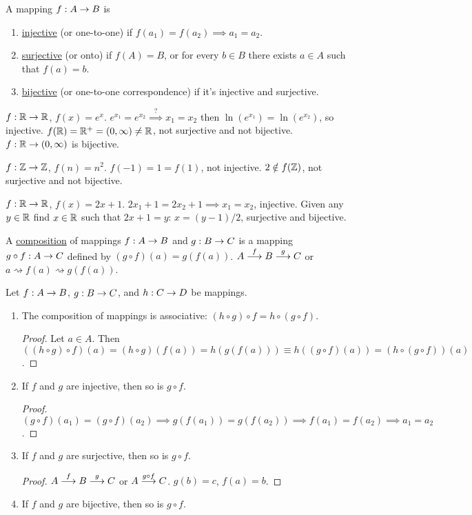 \documentclass[]{article}
\begin{document}
\begin{definition}
	A mapping $f:A\rightarrow B$ is
	\begin{enumerate}
		\item \ul{injective} (or one-to-one) if $f(a_1) = f(a_2) \implies a_1 = a_2$.
		\item \ul{surjective} (or onto) if $f(A) = B$, or for every $b\in B$ there exists $a\in A$ such that $f(a) = b$.
		\item \ul{bijective} (or one-to-one correspondence) if it's injective and surjective.
	\end{enumerate}
\end{definition}
\begin{example}
	$f:\mathbb{R}\rightarrow \mathbb{R}$, $f(x) = e^x$. $e^{x_1} = e^{x_2} \overset{?}{\implies} x_1 = x_2$ then $\ln(e^{x_1}) = \ln(e^{x_2})$, so injective. $f(\mathbb{R}) = \mathbb{R}^+ = (0,\infty) \neq \mathbb{R}$, not surjective and not bijective.
	$f:\mathbb{R} \rightarrow (0,\infty)$ is bijective.
\end{example}
\begin{example}
	$f:\mathbb{Z}\rightarrow\mathbb{Z}$, $f(n) = n^2$. $f(-1) = 1 = f(1)$, not injective. $2\notin f(\mathbb{Z})$, not surjective and not bijective.
\end{example}
\begin{example}
	$f:\mathbb{R}\rightarrow \mathbb{R}$, $f(x) = 2x+1$. $2x_1 + 1 = 2x_2 + 1 \implies x_1 = x_2$, injective. Given any $y\in \mathbb{R}$ find $x\in \mathbb{R}$ such that $2x+1 = y$: $x = (y-1)/2$, surjective and bijective.
\end{example}

A \ul{composition} of mappings $f:A\rightarrow B$ and $g:B\rightarrow C$ is a mapping $g\circ f: A\rightarrow C$ defined by $(g\circ f)(a) = g(f(a))$. $A \overset{f}{\longrightarrow} B \overset{g}{\longrightarrow} C$ or $a \rightsquigarrow f(a) \rightsquigarrow g(f(a))$.
\begin{theorem}
	Let $f:A\rightarrow B$, $g:B\rightarrow C$, and $h:C\rightarrow D$ be mappings.
	\begin{enumerate}
		\item The composition of mappings is associative: $(h\circ g) \circ f = h\circ(g\circ f)$.
		\begin{proof}
			Let $a\in A$. Then $((h\circ g)\circ f)(a) = (h\circ g)(f(a)) = h(g(f(a))) \equiv h((g\circ f)(a)) = (h\circ(g\circ f))(a)$.
		\end{proof}
		\item If $f$ and $g$ are injective, then so is $g\circ f$.
		\begin{proof}
			$(g\circ f)(a_1) = (g\circ f)(a_2) \implies g(f(a_1)) = g(f(a_2)) \implies f(a_1) = f(a_2) \implies a_1 = a_2$.
		\end{proof}
		\item If $f$ and $g$ are surjective, then so is $g\circ f$.
		\begin{proof}
			$A\overset{f}{\longrightarrow} B \overset{g}{\longrightarrow} C$ or $A\overset{g\circ f}{\longrightarrow} C$. $g(b) = c$, $f(a) = b$.
		\end{proof}
		\item If $f$ and $g$ are bijective, then so is $g\circ f$.
	\end{enumerate}
\end{theorem}
\end{document}
